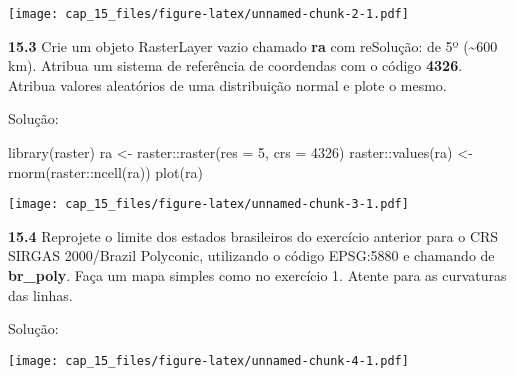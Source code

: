 \documentclass[
]{book}
\newenvironment{Shaded}{\begin{snugshade}}{\end{snugshade}}
\newcommand{\AttributeTok}[1]{\textcolor[rgb]{0.77,0.63,0.00}{#1}}
\newcommand{\ConstantTok}[1]{\textcolor[rgb]{0.00,0.00,0.00}{#1}}
\newcommand{\DecValTok}[1]{\textcolor[rgb]{0.00,0.00,0.81}{#1}}
\newcommand{\FunctionTok}[1]{\textcolor[rgb]{0.00,0.00,0.00}{#1}}
\newcommand{\NormalTok}[1]{#1}
\newcommand{\OtherTok}[1]{\textcolor[rgb]{0.56,0.35,0.01}{#1}}
\newcommand{\SpecialCharTok}[1]{\textcolor[rgb]{0.00,0.00,0.00}{#1}}
\newcommand{\StringTok}[1]{\textcolor[rgb]{0.31,0.60,0.02}{#1}}
\begin{document}
\texttt{[image: cap\_15\_files/figure-latex/unnamed-chunk-2-1.pdf]}

\textbf{15.3}
Crie um objeto RasterLayer vazio chamado \textbf{ra} com reSolução: de 5º (\textasciitilde600 km). Atribua um sistema de referência de coordendas com o código \textbf{4326}. Atribua valores aleatórios de uma distribuição normal e plote o mesmo.

Solução:

\begin{Shaded}
\begin{Highlighting}[]
\FunctionTok{library}\NormalTok{(raster)}
\NormalTok{ra }\OtherTok{\textless{}{-}}\NormalTok{ raster}\SpecialCharTok{::}\FunctionTok{raster}\NormalTok{(}\AttributeTok{res =} \DecValTok{5}\NormalTok{, }\AttributeTok{crs =} \DecValTok{4326}\NormalTok{)}
\NormalTok{raster}\SpecialCharTok{::}\FunctionTok{values}\NormalTok{(ra) }\OtherTok{\textless{}{-}} \FunctionTok{rnorm}\NormalTok{(raster}\SpecialCharTok{::}\FunctionTok{ncell}\NormalTok{(ra))}
\FunctionTok{plot}\NormalTok{(ra)}
\end{Highlighting}
\end{Shaded}

\texttt{[image: cap\_15\_files/figure-latex/unnamed-chunk-3-1.pdf]}

\textbf{15.4}
Reprojete o limite dos estados brasileiros do exercício anterior para o CRS SIRGAS 2000/Brazil Polyconic, utilizando o código EPSG:5880 e chamando de \textbf{br\_poly}. Faça um mapa simples como no exercício 1. Atente para as curvaturas das linhas.

Solução:

\begin{Shaded}
\end{Shaded}

\texttt{[image: cap\_15\_files/figure-latex/unnamed-chunk-4-1.pdf]}
\end{document}
